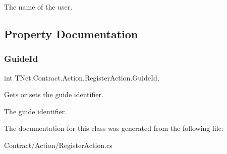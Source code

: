 The name of the user. 



\subsection{Property Documentation}
\mbox{\label{class_t_net_1_1_contract_1_1_action_1_1_register_action_a92747074dc2b73c493d55e3d7d98b930}} 
\subsubsection{\texorpdfstring{Guide\+Id}{GuideId}}
{\footnotesize\ttfamily int T\+Net.\+Contract.\+Action.\+Register\+Action.\+Guide\+Id\hspace{0.3cm}{\ttfamily [get]}, {\ttfamily [set]}}



Gets or sets the guide identifier. 

The guide identifier.

The documentation for this class was generated from the following file\+:\begin{DoxyCompactItemize}
\item 
Contract/\+Action/Register\+Action.\+cs\end{DoxyCompactItemize}
